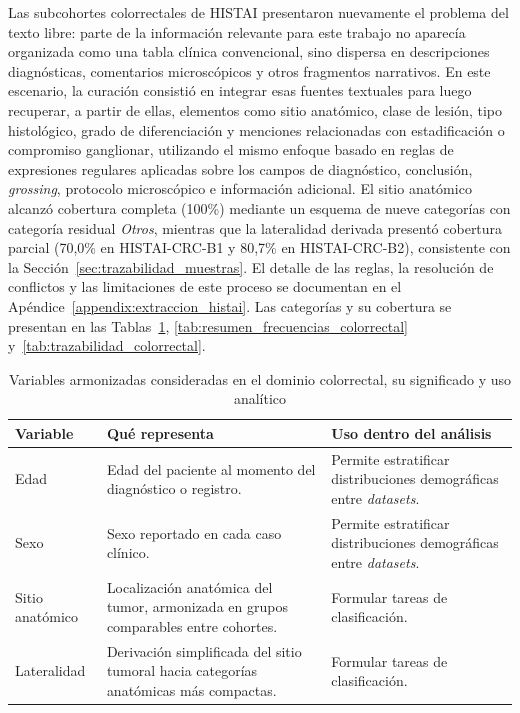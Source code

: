 Las subcohortes colorrectales de HISTAI presentaron nuevamente el problema del texto libre: parte de la información relevante para este trabajo no aparecía organizada como una tabla clínica convencional, sino dispersa en descripciones diagnósticas, comentarios microscópicos y otros fragmentos narrativos. En este escenario, la curación consistió en integrar esas fuentes textuales para luego recuperar, a partir de ellas, elementos como sitio anatómico, clase de lesión, tipo histológico, grado de diferenciación y menciones relacionadas con estadificación o compromiso ganglionar, utilizando el mismo enfoque basado en reglas de expresiones regulares aplicadas sobre los campos de diagnóstico, conclusión, \textit{grossing}, protocolo microscópico e información adicional. El sitio anatómico alcanzó cobertura completa (100\%) mediante un esquema de nueve categorías con categoría residual \textit{Otros}, mientras que la lateralidad derivada presentó cobertura parcial (70,0\% en HISTAI-CRC-B1 y 80,7\% en HISTAI-CRC-B2), consistente con la Sección~\ref{sec:trazabilidad_muestras}. El detalle de las reglas, la resolución de conflictos y las limitaciones de este proceso se documentan en el Apéndice~\ref{appendix:extraccion_histai}. Las categorías y su cobertura se presentan en las Tablas~\ref{tab:variables_armonizadas_significado_2}, \ref{tab:resumen_frecuencias_colorrectal} y~\ref{tab:trazabilidad_colorrectal}.

\begin{table}[H]
    \centering
    \caption{Variables armonizadas consideradas en el dominio colorrectal, su significado y uso analítico}
    \label{tab:variables_armonizadas_significado_2}

    \begin{tabular}{p{2.8cm}p{5.0cm}p{6.0cm}}
        \toprule
        \textbf{Variable} &
        \textbf{Qué representa} &
        \textbf{Uso dentro del análisis} \\
        \midrule

        Edad &
        Edad del paciente al momento del diagnóstico o registro. &
        Permite estratificar distribuciones demográficas entre \textit{datasets}. \\

        Sexo &
        Sexo reportado en cada caso clínico. &
        Permite estratificar distribuciones demográficas entre \textit{datasets}. \\

        Sitio anatómico &
        Localización anatómica del tumor, armonizada en grupos comparables entre cohortes. &
        Formular tareas de clasificación. \\

        Lateralidad &
        Derivación simplificada del sitio tumoral hacia categorías anatómicas más compactas. &
        Formular tareas de clasificación. \\
        \bottomrule
    \end{tabular}
\end{table}

